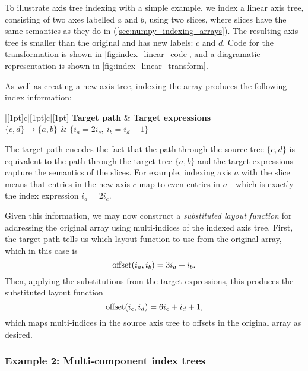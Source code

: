 \documentclass[thesis]{subfiles}
\begin{document}
To illustrate axis tree indexing with a simple example, we index a linear axis tree, consisting of two axes labelled $a$ and $b$, using two slices, where slices have the same semantics as they do in \numpy{} (\cref{sec:numpy_indexing_arrays}).
The resulting axis tree is smaller than the original and has new labels: $c$ and $d$.
Code for the transformation is shown in \cref{fig:index_linear_code}, and a diagramatic representation is shown in \cref{fig:index_linear_transform}.

As well as creating a new axis tree, indexing the array produces the following index information:
\begin{center}
  \begin{tblr}{|[1pt]c|[1pt]c|[1pt]}
    \hline[1pt]
    \textbf{Target path} & \textbf{Target expressions} \\
    \hline[1pt]
    $\{ c, d \} \to \{a, b\}$ & $\{i_a = 2 i_c,\ i_b = i_d+1\}$ \\
    \hline[1pt]
  \end{tblr}
\end{center}
The target path encodes the fact that the path through the source tree $\{c,d\}$ is equivalent to the path through the target tree $\{a,b\}$ and the target expressions capture the semantics of the slices.
For example, indexing axis $a$ with the slice \pycode{[::2]} means that entries in the new axis $c$ map to even entries in $a$ - which is exactly the index expression $i_a = 2i_c$.

Given this information, we may now construct a \emph{substituted layout function} for addressing the original array using multi-indices of the indexed axis tree.
First, the target path tells us which layout function to use from the original array, which in this case is
\begin{equation}
  \textnormal{offset}(i_a, i_b) = 3 i_a + i_b.
\end{equation}
Then, applying the substitutions from the target expressions, this produces the substituted layout function
\begin{equation}
  \textnormal{offset}(i_c, i_d) = 6 i_c + i_d + 1,
\end{equation}
which maps multi-indices in the source axis tree to offsets in the original array as desired.

\subsubsection{Example 2: Multi-component index trees}
\end{document}
